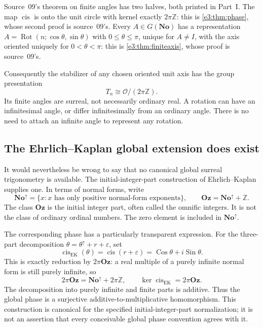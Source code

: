 \documentclass[11pt,letterpaper]{article}
\numberwithin{equation}{section}
\theoremstyle{definition}
\theoremstyle{remark}
\newcommand{\No}{\mathbf{No}}
\newcommand{\Z}{\mathbb Z}
\newcommand{\OO}{\mathcal O}
\newcommand{\Oz}{\mathbf{Oz}}
\newcommand{\eps}{\varepsilon}
\newcommand{\cis}{\operatorname{cis}}
\newcommand{\Sin}{\operatorname{Sin}}
\newcommand{\Cos}{\operatorname{Cos}}
\newcommand{\Rot}{\operatorname{Rot}}
\begin{document}
Source~09's theorem on finite angles has two halves, both printed in Part~I.
The map \(\cis\) is onto the unit circle with kernel exactly \(2\pi\Z\): this is
\cref{e3:thm:phase}, whose second proof is source~09's. Every \(A\in G(\No)\)
has a representation \(A=\Rot(n;\cos\theta,\sin\theta)\) with \(0\le\theta\le\pi\),
unique for \(A\ne I\), with the axis oriented uniquely for \(0<\theta<\pi\): this
is \cref{e3:thm:finiteaxis}, whose proof is source~09's.

Consequently the stabilizer of any chosen oriented unit axis has the group
presentation
\begin{equation}\label{e3:so:eq:finitequotient}
 T_n\cong\OO/(2\pi\Z).
\end{equation}
Its finite angles are surreal, not necessarily ordinary real. A rotation can
have an infinitesimal angle, or differ infinitesimally from an ordinary angle.
There is no need to attach an infinite angle to represent any rotation.

\subsection{The Ehrlich--Kaplan global extension does exist}

It would nevertheless be wrong to say that no canonical global surreal
trigonometry is available. The initial-integer-part construction of
Ehrlich--Kaplan \cite[\S11]{EK} supplies one. In terms of normal forms, write
\[
 \No^\uparrow=\{x:x\text{ has only positive normal-form exponents}\},\qquad
 \Oz=\No^\uparrow+\Z.
\]
The class \(\Oz\) is the initial integer part, often called the omnific
integers. It is not the class of ordinary ordinal numbers. The zero element
is included in \(\No^\uparrow\).

The corresponding phase has a particularly transparent expression. For the
three-part decomposition \(\theta=\theta^\uparrow+r+\eps\), set
\begin{equation}\label{e3:so:eq:globalphase}
 \cis_{\mathrm{EK}}(\theta)=\cis(r+\eps)
 =\Cos\theta+i\Sin\theta.
\end{equation}
This is exactly reduction by \(2\pi\Oz\): a real multiple of a purely infinite
normal form is still purely infinite, so
\begin{equation}\label{e3:so:eq:globalperiod}
 2\pi\Oz=\No^\uparrow+2\pi\Z,
 \qquad \ker\cis_{\mathrm{EK}}=2\pi\Oz.
\end{equation}
The decomposition into purely infinite and finite parts is additive. Thus the
global phase is a surjective additive-to-multiplicative homomorphism. This
construction is canonical for the specified initial-integer-part normalization;
it is not an assertion that every conceivable global phase convention agrees
with it.
\end{document}

